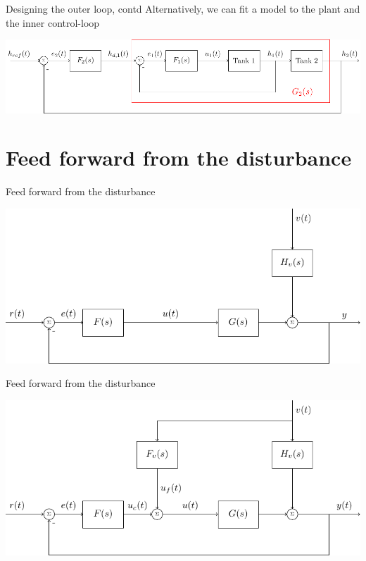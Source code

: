 \documentclass[presentation,aspectratio=169, usenames, dvipsnames]{beamer}
\begin{document}
\begin{frame}[label={sec:orgda56d20}]{Designing the outer loop, contd}
Alternatively, we can fit a model to the plant and the inner control-loop
\begin{center}
\includegraphics[width=0.9\linewidth]{../../figures/block-diagram-cascade-control-G2}
\end{center}
\end{frame}


\section{Feed forward from the disturbance}
\label{sec:orgd7d4967}

\begin{frame}[label={sec:org1ade855}]{Feed forward from the disturbance}
\begin{center}
\includegraphics[width=\linewidth]{../../figures/block-diagram-ffw-no-ffw}
\end{center}
\end{frame}

\begin{frame}[label={sec:org9655309}]{Feed forward from the disturbance}
\begin{center}
\includegraphics[width=\linewidth]{../../figures/block-diagram-ffw}
\end{center}
\end{frame}
\end{document}
